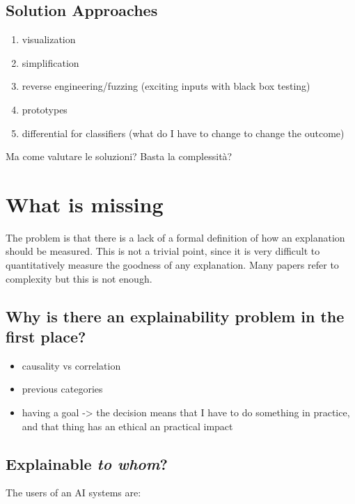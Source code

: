 \documentclass{article}
\begin{document}
\subsection{Solution Approaches}

\begin{enumerate}
    \item visualization
    \item simplification
    \item reverse engineering/fuzzing (exciting inputs with black box testing)
    \item prototypes
    \item differential for classifiers (what do I have to change to change the
          outcome)
\end{enumerate}

Ma come valutare le soluzioni? Basta la complessità?

\section{What is missing}

The problem is that there is a lack of a formal definition of how an explanation
should be measured. This is not a trivial point, since it is very difficult to
quantitatively measure the goodness of any explanation. Many papers refer to
complexity but this is not enough.

\subsection{Why is there an explainability problem in the first place?}

\begin{itemize}
    \item causality vs correlation
    \item previous categories
    \item having a goal -> the decision means that I have to do something in
          practice, and that thing has an ethical an practical impact
\end{itemize}

\subsection{Explainable \textit{to whom}?}

The users of an AI systems are:
\end{document}
